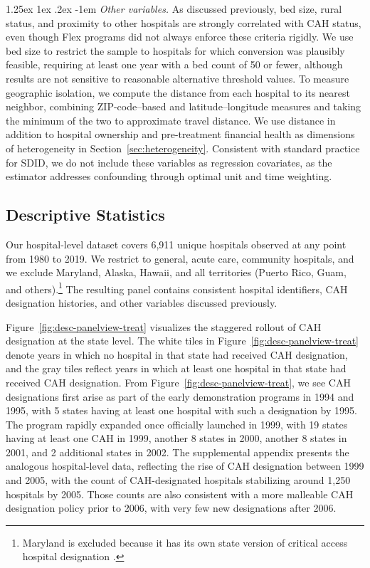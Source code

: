 \documentclass[a4paper, 12pt, twoside]{article}
\makeatletter
\renewcommand\paragraph{\@startsection{paragraph}{4}{\z@}%
   {1.25ex \@plus 1ex \@minus .2ex}%
   {-1em}%
   {\normalfont\itshape}}
\makeatother
\begin{document}
\paragraph{\textit{Other variables.}}  
As discussed previously, bed size, rural status, and proximity to other hospitals are strongly correlated with CAH status, even though Flex programs did not always enforce these criteria rigidly. We use bed size to restrict the sample to hospitals for which conversion was plausibly feasible, requiring at least one year with a bed count of 50 or fewer, although results are not sensitive to reasonable alternative threshold values. To measure geographic isolation, we compute the distance from each hospital to its nearest neighbor, combining ZIP-code--based and latitude--longitude measures and taking the minimum of the two to approximate travel distance. We use distance in addition to hospital ownership and pre-treatment financial health as dimensions of heterogeneity in Section~\ref{sec:heterogeneity}. Consistent with standard practice for SDID, we do not include these variables as regression covariates, as the estimator addresses confounding through optimal unit and time weighting.

\subsection{Descriptive Statistics}
\label{sec:desc}

Our hospital-level dataset covers 6,911 unique hospitals observed at any point from 1980 to 2019. We restrict to general, acute care, community hospitals, and we exclude Maryland, Alaska, Hawaii, and all territories (Puerto Rico, Guam, and others).\footnote{Maryland is excluded because it has its own state version of critical access hospital designation \citep{mhcc2020}.} The resulting panel contains consistent hospital identifiers, CAH designation histories, and other variables discussed previously.

Figure~\ref{fig:desc-panelview-treat} visualizes the staggered rollout of CAH designation at the state level. The white tiles in Figure~\ref{fig:desc-panelview-treat} denote years in which no hospital in that state had received CAH designation, and the gray tiles reflect years in which at least one hospital in that state had received CAH designation. From Figure~\ref{fig:desc-panelview-treat}, we see CAH designations first arise as part of the early demonstration programs in 1994 and 1995, with 5 states having at least one hospital with such a designation by 1995. The program rapidly expanded once officially launched in 1999, with 19 states having at least one CAH in 1999, another 8 states in 2000, another 8 states in 2001, and 2 additional states in 2002. The supplemental appendix presents the analogous hospital-level data, reflecting the rise of CAH designation between 1999 and 2005, with the count of CAH-designated hospitals stabilizing around 1,250 hospitals by 2005. Those counts are also consistent with a more malleable CAH designation policy prior to 2006, with very few new designations after 2006.
\end{document}
